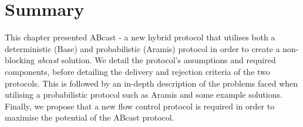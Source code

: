 \section{Summary}
This chapter presented \textsf{ABcast} - a new hybrid protocol that utilises both a deterministic (\textsf{Base}) and probabilistic (\textsf{Aramis}) protocol in order to create a non-blocking \emph{abcast} solution.  We detail the protocol's assumptions and required components, before detailing the delivery and rejection criteria of the two protocols.  This is followed by an in-depth description of the problems faced when utilising a probabilistic protocol such as \textsf{Aramis} and some example solutions.  Finally, we propose that a new flow control protocol is required in order to maximise the potential of the \textsf{ABcast} protocol.  